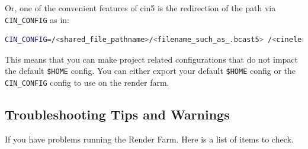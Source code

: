 \noindent Or, one of the convenient features of cin5 is the redirection of the path via \texttt{CIN\_CONFIG} as in:
\begin{lstlisting}[language=bash]
CIN_CONFIG=/<shared_file_pathname>/<filename_such_as_.bcast5> /<cinelerra_pathname>/cin
\end{lstlisting}
This means that you can make project related configurations that do not impact the default \texttt{\$HOME} config.  You can either export your default \texttt{\$HOME} config or the \texttt{CIN\_CONFIG} config to use on the render farm.

\subsection{Troubleshooting Tips and Warnings}%
\label{sub:troubleshhoting_tips_warnings}

\noindent If you have problems running the Render Farm.  Here is a list of items to check.


